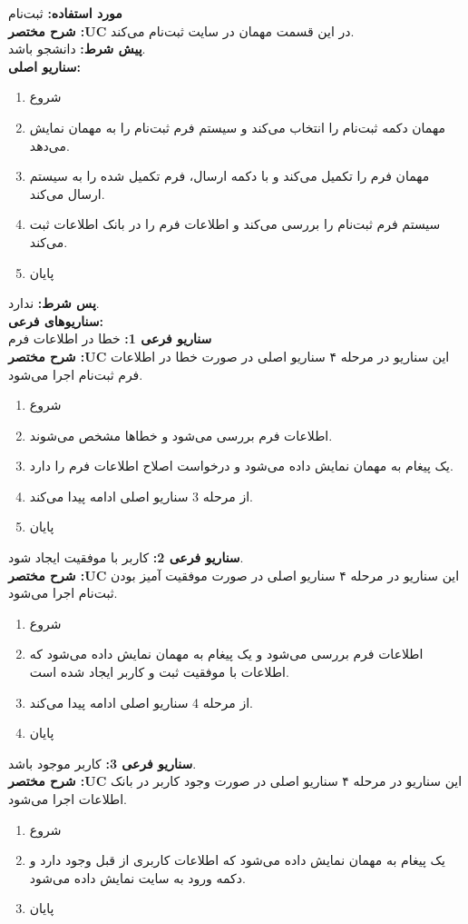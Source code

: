 
\textbf{مورد استفاده:}
ثبت‌نام
\\
\textbf{شرح مختصر :UC}
در این قسمت مهمان در سایت ثبت‌نام می‌کند.
\\
\textbf{پيش شرط:}
دانشجو باشد.
\\
\textbf{سناريو اصلی:}
\begin{enumerate}
\item
شروع
\item
مهمان دکمه ثبت‌نام را انتخاب می‌کند و سیستم فرم ثبت‌نام را به مهمان نمایش می‌دهد.
\item
مهمان فرم را تکمیل می‌کند و با دکمه ارسال، فرم تکمیل شده را به سیستم ارسال می‌کند.
\item
سیستم فرم ثبت‌نام را بررسی می‌کند و اطلاعات فرم را در بانک اطلاعات ثبت می‌کند.
\item
پایان
\end{enumerate}

\noindent
\textbf{پس شرط:}
ندارد.
\\
\textbf{سناريوهای فرعی:}
\\
\textbf{سناريو فرعی 1:}
خطا در اطلاعات فرم
\\
\textbf{شرح مختصر :UC}
این سناریو در مرحله ۴ سناریو اصلی در صورت خطا در اطلاعات فرم ثبت‌نام اجرا می‌شود.
\begin{enumerate}
\item
شروع
\item
اطلاعات فرم بررسی می‌شود و خطاها مشخص می‌شوند.
\item
یک پیغام به مهمان نمایش داده می‌شود و درخواست اصلاح اطلاعات فرم را دارد.
\item
از مرحله 3 سناریو اصلی ادامه پیدا می‌کند.
\item
پایان
\end{enumerate}

\noindent
\textbf{سناريو فرعی 2:}
کاربر با موفقیت ایجاد شود.
\\
\textbf{شرح مختصر :UC}
این سناریو در مرحله ۴ سناریو اصلی در صورت موفقیت آمیز بودن ثبت‌نام اجرا می‌شود.
\begin{enumerate}
\item
شروع
\item
اطلاعات فرم بررسی می‌شود و یک پیغام به مهمان نمایش داده می‌شود که اطلاعات با موفقیت ثبت و کاربر ایجاد شده است.
\item
از مرحله 4 سناریو اصلی ادامه پیدا می‌کند.
\item
پایان
\end{enumerate}

\noindent
\textbf{سناريو فرعی 3:}
کاربر موجود باشد.
\\
\textbf{شرح مختصر :UC}
این سناریو در مرحله ۴ سناریو اصلی در صورت وجود کاربر در بانک اطلاعات اجرا می‌شود.
\begin{enumerate}
\item
شروع
\item
یک پیغام به مهمان نمایش داده می‌شود که اطلاعات کاربری از قبل وجود دارد و دکمه ورود به سایت نمایش داده می‌شود.
\item
پایان
\end{enumerate}

